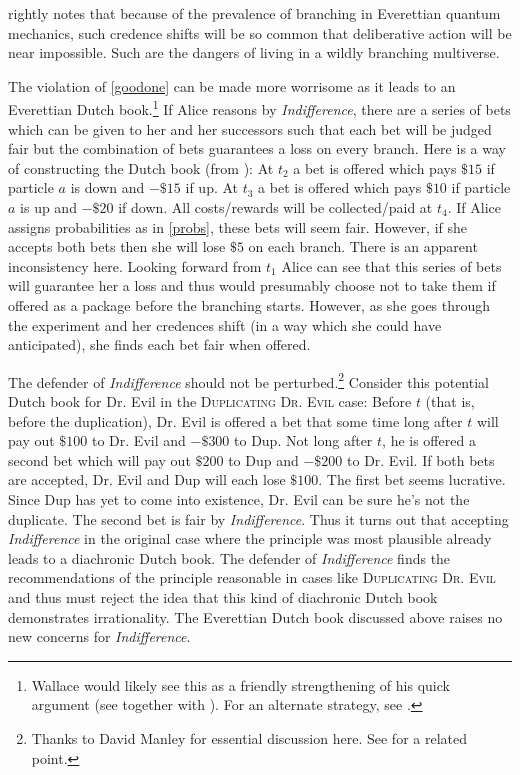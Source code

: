 \documentclass[onecolumn,secnumarabic,amsmath,amssymb,balancelastpage,nofootinbib]{article}
\begin{document}
\citet[]{wallace2012} rightly notes that because of the prevalence of branching in Everettian quantum mechanics, such credence shifts will be so common that deliberative action will be near impossible.  Such are the dangers of living in a wildly branching multiverse.

The violation of \eqref{goodone} can be made more worrisome as it leads to an Everettian Dutch book.\footnote{Wallace would likely see this as a friendly strengthening of his quick argument (see \citealp[]{wallace2012} together with \citealp[p. 247]{wallace2010xi}). For an alternate strategy, see \citep[\textsection II]{wallace2010xi}.}  If Alice reasons by \emph{Indifference}, there are a series of bets which can be given to her and her successors such that each bet will be judged fair but the combination of bets guarantees a loss on every branch.  Here is a way of constructing the Dutch book (from \citealp[]{peterson}):  At $t_2$ a bet is offered which pays $\$15$ if particle $a$ is down and $-\$15$ if up.  At $t_3$ a bet is offered which pays $\$10$ if particle $a$ is up and $-\$20$ if down.  All costs/rewards will be collected/paid at $t_4$.  If Alice assigns probabilities as in \eqref{probs}, these bets will seem fair.  However, if she accepts both bets then she will lose $\$5$ on each branch.  There is an apparent inconsistency here.  Looking forward from $t_1$ Alice can see that this series of bets will guarantee her a loss and thus would presumably choose not to take them if offered as a package before the branching starts.  However, as she goes through the experiment and her credences shift (in a way which she could have anticipated), she finds each bet fair when offered.

The defender of \emph{Indifference} should not be perturbed.\footnote{Thanks to David Manley for essential discussion here.  See \citep{lewis2009} for a related point.}  Consider this potential Dutch book for Dr. Evil in the \textsc{Duplicating Dr. Evil} case: Before $t$ (that is, before the duplication), Dr. Evil is offered a bet that some time long after $t$ will pay out $\$100$ to Dr. Evil and $-\$300$ to Dup.  Not long after $t$, he is offered a second bet which will pay out $\$200$ to Dup and $-\$200$ to Dr. Evil.  If both bets are accepted, Dr. Evil and Dup will each lose $\$100$.  The first bet seems lucrative.  Since Dup has yet to come into existence, Dr. Evil can be sure he's not the duplicate.  The second bet is fair by \emph{Indifference}.  Thus it turns out that accepting \textit{Indifference} in the original case where the principle was most plausible already leads to a diachronic Dutch book.  The defender of \emph{Indifference} finds the recommendations of the principle reasonable in cases like \textsc{Duplicating Dr. Evil} and thus must reject the idea that this kind of diachronic Dutch book demonstrates irrationality.  The Everettian Dutch book discussed above raises no new concerns for \emph{Indifference}.
\end{document}
